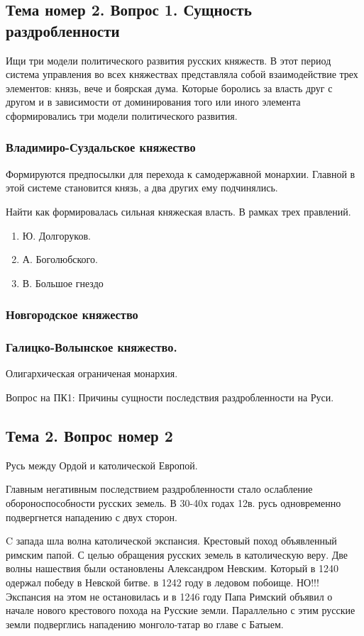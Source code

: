 \documentclass[a4paper]{article}
\begin{document}
\subsection{Тема номер 2. Вопрос 1. Сущность раздробленности}
Ищи три модели политического развития русских княжеств.
В этот период система управления во всех княжествах представляла собой взаимодействие трех элементов: князь, вече и боярская дума. Которые боролись за власть друг с другом и в зависимости от доминирования того или иного элемента сформировались три модели политического развития.

\subsubsection{Владимиро-Суздальское княжество}
Формируются предпосылки для перехода к самодержавной монархии. Главной в этой системе становится князь, а два других ему подчинялись.

Найти как формировалась сильная княжеская власть. В рамках трех правлений.
\begin{enumerate}
\item Ю. Долгоруков.
\item А. Боголюбского.
\item В. Большое гнездо
\end{enumerate}

\subsubsection{Новгородское княжество}

\subsubsection{Галицко-Волынское княжество.}
Олигархическая ограниченая монархия. 

Вопрос на ПК1: Причины сущности последствия раздробленности на Руси.

\subsection{Тема 2. Вопрос номер 2}
Русь между Ордой и католической Европой.

Главным негативным последствием раздробленности стало ослабление обороноспособности русских земель.
В 30-40х годах 12в. русь одновременно подвергнется нападению с двух сторон.

C запада шла волна католической экспансия. Крестовый поход объявленный римским папой. С целью обращения русских земель в католическую веру. Две волны нашествия были остановлены Александром Невским. Который в 1240 одержал победу в Невской битве. в 1242 году в ледовом побоище. НО!!! Экспансия на этом не остановилась и в 1246 году Папа Римский объявил о начале нового крестового похода на Русские земли. Параллельно с этим русские земли подверглись нападению монголо-татар во главе с Батыем.
\end{document}
